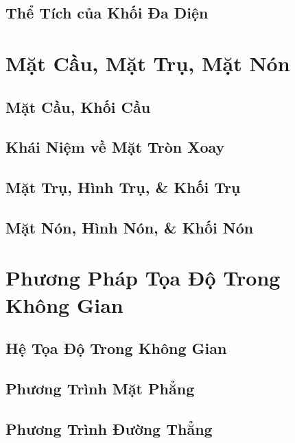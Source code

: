 \documentclass{article}
\numberwithin{equation}{section}
\begin{document}
\subsection{Thể Tích của Khối Đa Diện}


\section{Mặt Cầu, Mặt Trụ, Mặt Nón}

\subsection{Mặt Cầu, Khối Cầu}


\subsection{Khái Niệm về Mặt Tròn Xoay}


\subsection{Mặt Trụ, Hình Trụ, \& Khối Trụ}


\subsection{Mặt Nón, Hình Nón, \& Khối Nón}


\section{Phương Pháp Tọa Độ Trong Không Gian}

\subsection{Hệ Tọa Độ Trong Không Gian}


\subsection{Phương Trình Mặt Phẳng}


\subsection{Phương Trình Đường Thẳng}


\printbibliography[heading=bibintoc]
	
\end{document}
